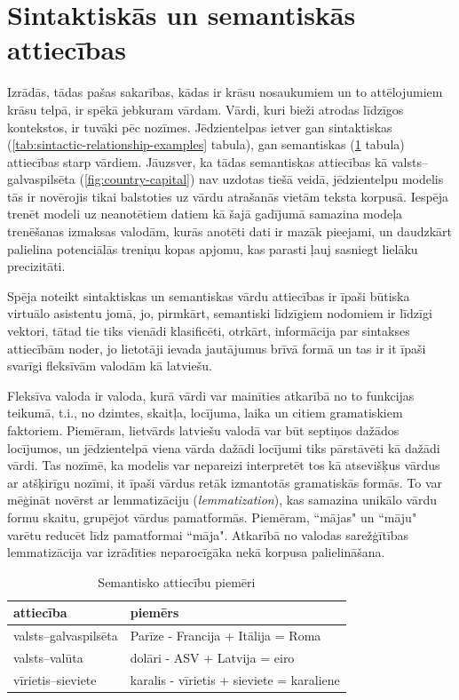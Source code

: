 \section{Sintaktiskās un semantiskās attiecības}

Izrādās, tādas pašas sakarības, kādas ir krāsu nosaukumiem un to attēlojumiem krāsu telpā, ir spēkā jebkuram vārdam. Vārdi, kuri bieži atrodas līdzīgos kontekstos, ir tuvāki pēc nozīmes. Jēdzientelpas ietver gan sintaktiskas (\ref{tab:sintactic-relationship-examples} tabula), gan semantiskas (\ref{tab:semantic-relationship-examples} tabula) attiecības starp vārdiem. Jāuzsver, ka tādas semantiskas attiecības kā valsts--galvaspilsēta (\ref{fig:country-capital}) nav uzdotas tiešā veidā, jēdzientelpu modelis tās ir novērojis tikai balstoties uz vārdu atrašanās vietām teksta korpusā. Iespēja trenēt modeli uz neanotētiem datiem kā šajā gadījumā samazina modeļa trenēšanas izmaksas valodām, kurās anotēti dati ir mazāk pieejami, un daudzkārt palielina potenciālās treniņu kopas apjomu, kas parasti ļauj sasniegt lielāku precizitāti.

Spēja noteikt sintaktiskas un semantiskas vārdu attiecības ir īpaši būtiska virtuālo asistentu jomā, jo, pirmkārt, semantiski līdzīgiem nodomiem ir līdzīgi vektori, tātad tie tiks vienādi klasificēti, otrkārt, informācija par sintakses attiecībām noder, jo lietotāji ievada jautājumus brīvā formā un tas ir it īpaši svarīgi fleksīvām valodām kā latviešu.

Fleksīva valoda ir valoda, kurā vārdi var mainīties atkarībā no to funkcijas teikumā, t.i., no dzimtes, skaitļa, locījuma, laika un citiem gramatiskiem faktoriem. Piemēram, lietvārds latviešu valodā var būt septiņos dažādos locījumos, un jēdzientelpā viena vārda dažādi locījumi tiks pārstāvēti kā dažādi vārdi. Tas nozīmē, ka modelis var nepareizi interpretēt tos kā atsevišķus vārdus ar atšķirīgu nozīmi, it īpaši vārdus retāk izmantotās gramatiskās formās. To var mēģināt novērst ar lemmatizāciju (\textit{lemmatization}), kas samazina unikālo vārdu formu skaitu, grupējot vārdus pamatformās. Piemēram, “mājas" un “māju" varētu reducēt līdz pamatformai “māja". Atkarībā no valodas sarežģītības lemmatizācija var izrādīties neparocīgāka nekā korpusa palielināšana.


\begin{table}[htbp]
	\centering
	\caption{Semantisko attiecību piemēri \cite{word2vec2013}}
	\begin{tabular}{ll}\toprule
		attiecība & piemērs  \\\midrule
		valsts--galvaspilsēta   & Parīze - Francija + Itālija = Roma \\
		valsts--valūta   & dolāri - ASV + Latvija = eiro \\
		vīrietis--sieviete   & karalis - vīrietis + sieviete = karaliene \\\bottomrule
	\end{tabular}%
	\label{tab:semantic-relationship-examples}%
\end{table}

